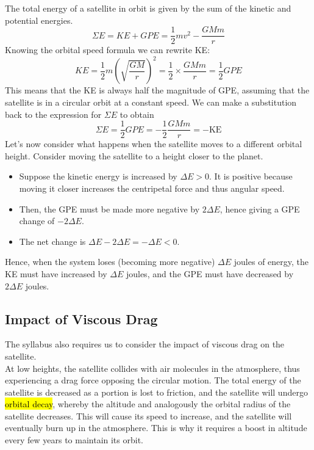 \documentclass[a4paper,12pt]{article}
\newcommand{\lb}{\\[8pt]}
\newcommand{\paren}[1]{\left(#1\right)}
\begin{document}
The total energy of a satellite in orbit is given by the sum of the kinetic and potential energies.
$$\Sigma E = KE + GPE = \frac{1}{2}mv^2 - \frac{GMm}{r}$$
Knowing the orbital speed formula we can rewrite KE:
$$KE = \frac{1}{2}m\paren{\sqrt{\frac{GM}{r}}}^2 = \frac{1}{2}\times \frac{GMm}{r} = \frac{1}{2} GPE$$
This means that the KE is always half the magnitude of GPE, assuming that the satellite is in a circular orbit at a constant speed. We can make a substitution back to the expression for $\Sigma E$ to obtain
\begin{equation}\label{eq:total_energy}
  \Sigma E = \frac{1}{2}GPE = -\frac{1}{2} \frac{GMm}{r} = -\text{KE}
\end{equation}
Let's now consider what happens when the satellite moves to a different orbital height. Consider moving the satellite to a height closer to the planet.
\begin{itemize}
  \item Suppose the kinetic energy is increased by $\Delta E > 0$. It is positive because moving it closer increases the centripetal force and thus angular speed.
  \item Then, the GPE must be made more negative by $2\Delta E$, hence giving a GPE change of $-2\Delta E$.
  \item The net change is $\Delta E - 2\Delta E = -\Delta E < 0$.
\end{itemize}
Hence, when the system loses (becoming more negative) $\Delta E$ joules of energy, the KE must have increased by $\Delta E$ joules, and the GPE must have decreased by $2\Delta E$ joules.

\pagebreak

\subsection{Impact of Viscous Drag}

The syllabus also requires us to consider the impact of viscous drag on the satellite.\lb
At low heights, the satellite collides with air molecules in the atmosphere, thus experiencing a drag force opposing the circular motion. The total energy of the satellite is decreased as a portion is lost to friction, and the satellite will undergo \hl{orbital decay}, whereby the altitude and analogously the orbital radius of the satellite decreases. This will cause its speed to increase, and the satellite will eventually burn up in the atmosphere. This is why it requires a boost in altitude every few years to maintain its orbit.
\end{document}
